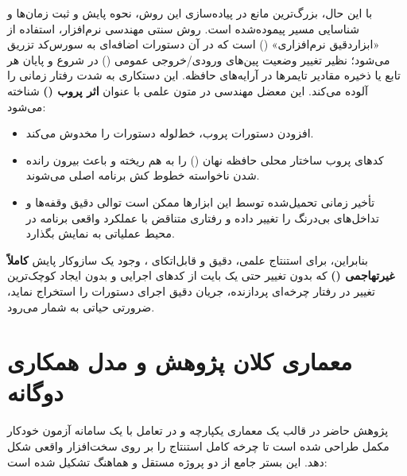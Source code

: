 با این حال، بزرگ‌ترین مانع در پیاده‌سازی این روش، نحوه پایش و ثبت زمان‌ها و شناسایی مسیر پیموده‌شده است. روش سنتی مهندسی نرم‌افزار، استفاده از «ابزاردقیق نرم‌افزاری» () است که در آن دستورات اضافه‌ای به سورس‌کد تزریق می‌شود؛ نظیر تغییر وضعیت پین‌های ورودی/خروجی عمومی () در شروع و پایان هر تابع یا ذخیره مقادیر تایمرها در آرایه‌های حافظه. این دستکاری به شدت رفتار زمانی را آلوده می‌کند. این معضل مهندسی در متون علمی با عنوان \textbf{اثر پروب ()} شناخته می‌شود:
\begin{itemize}
    \item افزودن دستورات پروب، خط‌لوله دستورات را مخدوش می‌کند.
    \item کدهای پروب ساختار محلی حافظه نهان () را به هم ریخته و باعث بیرون رانده شدن ناخواسته خطوط کش برنامه اصلی می‌شوند.
    \item تأخیر زمانی تحمیل‌شده توسط این ابزارها ممکن است توالی دقیق وقفه‌ها و تداخل‌های بی‌درنگ را تغییر داده و رفتاری متناقض با عملکرد واقعی برنامه در محیط عملیاتی به نمایش بگذارد.
\end{itemize}

بنابراین، برای استنتاج علمی، دقیق و قابل‌اتکای ، وجود یک سازوکار پایش \textbf{کاملاً غیرتهاجمی ()} که بدون تغییر حتی یک بایت از کدهای اجرایی و بدون ایجاد کوچک‌ترین تغییر در رفتار چرخه‌ای پردازنده، جریان دقیق اجرای دستورات را استخراج نماید، ضرورتی حیاتی به شمار می‌رود.

\section{معماری کلان پژوهش و مدل همکاری دوگانه}
پژوهش حاضر در قالب یک معماری یکپارچه و در تعامل با یک سامانه آزمون خودکار مکمل طراحی شده است تا چرخه کامل استنتاج  را بر روی سخت‌افزار واقعی شکل دهد. این بستر جامع از دو پروژه مستقل و هماهنگ تشکیل شده است:

